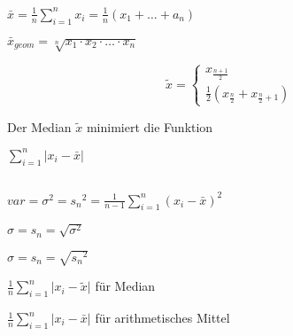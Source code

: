 \documentclass[10pt,a4paper,landscape]{article}
\begin{document}
\begin{multicols*}{4}

\section{\noindent{}}
\subsection{\noindent{}}

\noindent{}
\parbox{\columnwidth}{\centering$\bar{x}=\frac{1}{n}\sum \limits_{i=1}^n x_i=\frac{1}{n}(x_1 + \dots + a_n)$}

\noindent{}
\parbox{\columnwidth}{\centering$\bar{x}_{geom} = \sqrt[n]{x_1 \cdot x_2 \cdot \dots \cdot x_n}$}

\noindent{}
\parbox{\columnwidth}{\centering\[\tilde{x}=\begin{cases}x_{\frac{n+1}{2}}\\\frac{1}{2}(x_{\frac{n}{2}}+x_{\frac{n}{2}+1})\end{cases}\]}
Der Median $\tilde{x}$ minimiert die Funktion
\parbox{\columnwidth}{\centering$\sum \limits_{i=1}^n \vert x_i- \bar{x} \vert$}

\subsection{\noindent{}}

\noindent{}
\parbox{\columnwidth}{\centering$var = \sigma^2 = {s_n}^2 = \frac{1}{n-1} \sum \limits_{i=1}^n(x_i-\bar{x})^2$}

\noindent{}
\parbox{\columnwidth}{\centering$\sigma = s_n = \sqrt{\sigma^2}$}
\parbox{\columnwidth}{\centering$\sigma = s_n = \sqrt{{s_n}^2}$}

\noindent{}
\parbox{\columnwidth}{\centering$\frac{1}{n} \sum \limits_{i=1}^n \vert x_i - \tilde{x} \vert$ für Median}
\parbox{\columnwidth}{\centering$\frac{1}{n} \sum \limits_{i=1}^n \vert x_i - \bar{x} \vert$ für arithmetisches Mittel}

\subsection{\noindent{}}


\end{multicols*}
\end{document}
